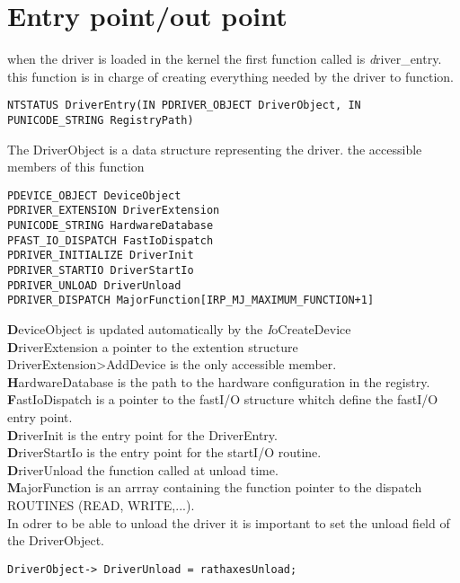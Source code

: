\documentclass[a4paper,10pt]{article}
\begin{document}
\section{Entry point/out point}
when the driver is loaded in the kernel the first function called is
{\textit driver\_entry}. this function is in charge of creating everything needed
by the driver to function.\\
\begin{lstlisting}
NTSTATUS DriverEntry(IN PDRIVER_OBJECT DriverObject, IN PUNICODE_STRING RegistryPath)
\end{lstlisting}
The DriverObject is a data structure representing the driver. the accessible
members of this function
\begin{lstlisting}
PDEVICE_OBJECT DeviceObject
PDRIVER_EXTENSION DriverExtension
PUNICODE_STRING HardwareDatabase
PFAST_IO_DISPATCH FastIoDispatch
PDRIVER_INITIALIZE DriverInit
PDRIVER_STARTIO DriverStartIo
PDRIVER_UNLOAD DriverUnload
PDRIVER_DISPATCH MajorFunction[IRP_MJ_MAXIMUM_FUNCTION+1]
\end{lstlisting}
{\textbf DeviceObject} is updated automatically by the {\textit IoCreateDevice}\\
{\textbf DriverExtension} a pointer to the extention structure DriverExtension>AddDevice is the only accessible member.\\
{\textbf HardwareDatabase} is the path to the hardware configuration in the registry.\\
{\textbf FastIoDispatch} is a pointer to the fastI/O structure whitch define the fastI/O entry point.\\
{\textbf DriverInit} is the entry point for the DriverEntry.\\
{\textbf DriverStartIo} is the entry point for the startI/O routine.\\
{\textbf DriverUnload} the function called at unload time.\\
{\textbf MajorFunction} is an arrray containing the function pointer to the dispatch ROUTINES (READ, WRITE,...).\\
In odrer to be able to unload the driver it is important to set the unload
field of the DriverObject.
\begin{lstlisting}
DriverObject-> DriverUnload = rathaxesUnload;
\end{lstlisting}
\end{document}
